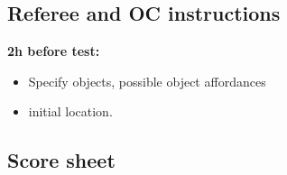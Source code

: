 \subsection{Referee and OC instructions}
\textbf{2h before test:}
\begin{itemize}
	\item Specify objects, possible object affordances
	\item initial location.
\end{itemize}

\newpage
\subsection{Score sheet}

%

